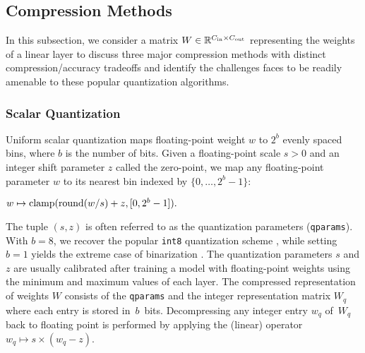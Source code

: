

\subsection{Compression Methods}
\label{subsec:comp_methods}
In this subsection, we consider a matrix $W \in \mathbb{R}^{C_{\text{in}}\times C_{\text{out}}}$ representing the weights of a linear layer to discuss three major compression methods with distinct compression/accuracy tradeoffs and identify the challenges \SecAgg faces to be readily amenable to these popular quantization algorithms.

\subsubsection{Scalar Quantization}
\label{subsec:sq}

 Uniform scalar quantization maps floating-point weight $w$ to $2^b$ evenly spaced bins, where $b$ is the number of bits. Given a floating-point scale $s > 0$ and an integer shift parameter $z$ called the zero-point, we map any floating-point parameter $w$ to its nearest bin indexed by $\{0,\dots, 2^b-1\}$:

\centerline{$w \mapsto \operatorname{clamp}(\operatorname{round}(w /s) + z, [0, 2^b - 1] ).$}

%
The tuple $(s, z)$ is often referred to as the quantization parameters (\texttt{qparams}).
With $b=8$, we recover the popular \texttt{int8} quantization scheme \citep{jacob2017quantization}, while setting $b = 1$ yields the extreme case of binarization \citep{courbariaux2015binaryconnect}. 
The quantization parameters $s$ and $z$ are usually calibrated after training a model with floating-point weights using the minimum and maximum values of each layer. 
The compressed representation of weights $W$ consists of the \texttt{qparams} and the integer representation matrix $W_q$ where each entry is stored in~$b$~bits. 
Decompressing any integer entry $w_q$ of~$W_q$ back to floating point is performed by applying  the (linear) operator $w_q \mapsto s\times(w_q - z)$.

